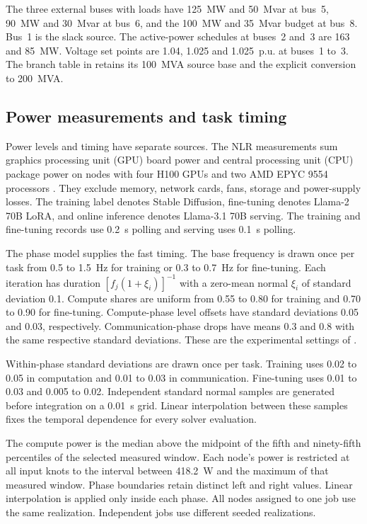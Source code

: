 The three external buses with loads have 125~MW and 50~Mvar at bus~5, 90~MW and 30~Mvar at bus~6, and the 100~MW and 35~Mvar budget at bus~8.
Bus~1 is the slack source.
The active-power schedules at buses~2 and~3 are 163 and 85~MW.
Voltage set points are 1.04, 1.025 and 1.025~p.u. at buses~1 to~3.
The branch table in  retains its 100~MVA source base and the explicit conversion to 200~MVA.

\subsection{Power measurements and task timing}
Power levels and timing have separate sources.
The NLR measurements sum graphics processing unit (GPU) board power and central processing unit (CPU) package power on nodes with four H100 GPUs and two AMD EPYC 9554 processors \cite{vercellino2026measurement}.
They exclude memory, network cards, fans, storage and power-supply losses.
The training label denotes Stable Diffusion, fine-tuning denotes Llama-2 70B LoRA, and online inference denotes Llama-3.1 70B serving.
The training and fine-tuning records use 0.2~s polling and serving uses 0.1~s polling.

The phase model supplies the fast timing.
The base frequency is drawn once per task from 0.5 to 1.5~Hz for training or 0.3 to 0.7~Hz for fine-tuning.
Each iteration has duration $[f_j(1+\xi_i)]^{-1}$ with a zero-mean normal $\xi_i$ of standard deviation 0.1.
Compute shares are uniform from 0.55 to 0.80 for training and 0.70 to 0.90 for fine-tuning.
Compute-phase level offsets have standard deviations 0.05 and 0.03, respectively.
Communication-phase drops have means 0.3 and 0.8 with the same respective standard deviations.
These are the experimental settings of \cite{ko2026oscillations}.

Within-phase standard deviations are drawn once per task.
Training uses 0.02 to 0.05 in computation and 0.01 to 0.03 in communication.
Fine-tuning uses 0.01 to 0.03 and 0.005 to 0.02.
Independent standard normal samples are generated before integration on a 0.01~s grid.
Linear interpolation between these samples fixes the temporal dependence for every solver evaluation.

The compute power is the median above the midpoint of the fifth and ninety-fifth percentiles of the selected measured window.
Each node's power is restricted at all input knots to the interval between 418.2~W and the maximum of that measured window.
Phase boundaries retain distinct left and right values.
Linear interpolation is applied only inside each phase.
All nodes assigned to one job use the same realization.
Independent jobs use different seeded realizations.

